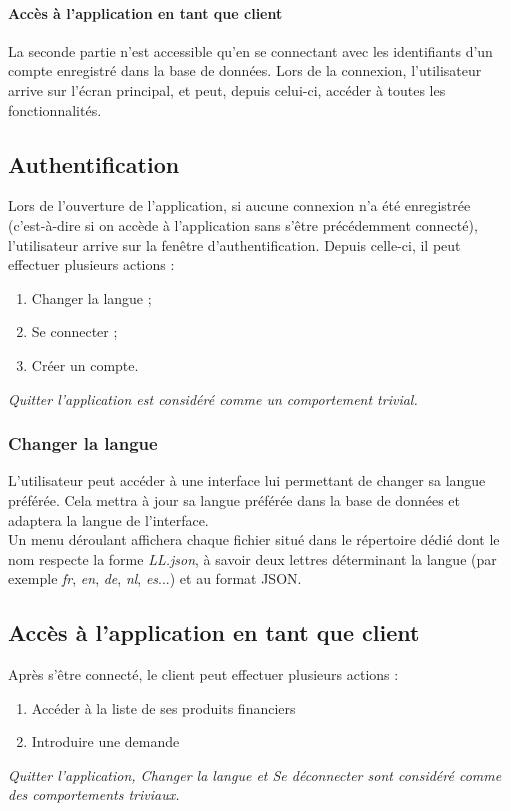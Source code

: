 \documentclass{article}
\begin{document}
\paragraph{Accès à l'application en tant que client}La seconde partie n'est accessible qu'en se connectant avec les identifiants d'un compte enregistré dans la base de données. Lors de la connexion, l'utilisateur arrive sur l'écran principal, et peut, depuis celui-ci, accéder à toutes les fonctionnalités.


\subsection{Authentification}
Lors de l'ouverture de l'application, si aucune connexion n'a été enregistrée (c'est-à-dire si on accède à l'application sans s'être précédemment connecté), l'utilisateur arrive sur la fenêtre d'authentification. Depuis celle-ci, il peut effectuer plusieurs actions :
\begin{enumerate}
\item Changer la langue ;
\item Se connecter ;
\item Créer un compte.
\end{enumerate}
\begin{footnotesize}
\textit{\emph{Quitter l'application} est considéré comme un comportement trivial.}
\end{footnotesize}


\subsubsection{Changer la langue}
L'utilisateur peut accéder à une interface lui permettant de changer sa langue préférée. Cela mettra à jour sa langue préférée dans la base de données et adaptera la langue de l'interface.\\
\indent Un menu déroulant affichera chaque fichier situé dans le répertoire dédié dont le nom respecte la forme \emph{LL.json}, à savoir deux lettres déterminant la langue (par exemple \emph{fr}, \emph{en}, \emph{de}, \emph{nl}, \emph{es}...) et au format JSON.


\subsection{Accès à l'application en tant que client}
Après s'être connecté, le client peut effectuer plusieurs actions :
\begin{enumerate}
\item Accéder à la liste de ses produits financiers
\item Introduire une demande
\end{enumerate}
\textit{\emph{Quitter l'application}, \emph{Changer la langue} et \emph{Se déconnecter} sont considéré comme des comportements triviaux.}
\end{document}
